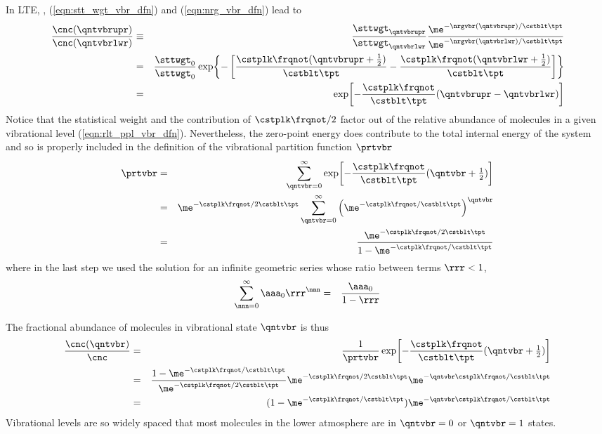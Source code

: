 \documentclass[12pt]{article}
\begin{document}
In LTE, , (\ref{eqn:stt_wgt_vbr_dfn}) and
(\ref{eqn:nrg_vbr_dfn}) lead to
\begin{eqnarray}
\frac{\cnc(\qntvbrupr)}{\cnc(\qntvbrlwr)} & \equiv & 
\frac{\sttwgt_{\qntvbrupr}}{\sttwgt_{\qntvbrlwr}}
\frac{\me^{-\nrgvbr(\qntvbrupr)/\cstblt\tpt}}{\me^{-\nrgvbr(\qntvbrlwr)/\cstblt\tpt}}
\nonumber \\ 
& = & 
\frac{\sttwgt_{0}}{\sttwgt_{0}}
\exp\! \left\{
- \left[ \frac{\cstplk \frqnot (\qntvbrupr + \frac{1}{2})}{\cstblt \tpt}
-\frac{\cstplk \frqnot (\qntvbrlwr + \frac{1}{2})}{\cstblt \tpt}
\right] \right\} \nonumber \\
& = & 
\exp\! \left[
-\frac{\cstplk \frqnot}{\cstblt \tpt}(\qntvbrupr - \qntvbrlwr)
\right]
\label{eqn:rlt_ppl_vbr_dfn}
\end{eqnarray}
Notice that the statistical weight and the  
contribution of $\cstplk \frqnot /2$ factor out of the relative
abundance of molecules in a given vibrational level
(\ref{eqn:rlt_ppl_vbr_dfn}).
Nevertheless, the zero-point energy does contribute to the total
internal energy of the system and so is properly included in the 
definition of the vibrational partition function $\prtvbr$
\begin{eqnarray}
\prtvbr & = & 
\sum_{\qntvbr = 0}^{\infty} 
\exp\! \left[
-\frac{\cstplk \frqnot}{\cstblt \tpt} ( \qntvbr + {\textstyle\frac{1}{2}} )
\right] \nonumber \\
& = & 
\me^{-\cstplk \frqnot/2\cstblt \tpt}
\sum_{\qntvbr = 0}^{\infty} 
\left( \me^{-\cstplk \frqnot / \cstblt \tpt} \right)^{\qntvbr}
\nonumber \\
& = & 
\frac{\me^{-\cstplk \frqnot/2\cstblt \tpt}}
{1-\me^{-\cstplk \frqnot / \cstblt \tpt}}
\label{eqn:prt_vbr_val}
\end{eqnarray}
where in the last step we used the solution for an infinite
geometric series whose ratio between terms $\rrr < 1$, 
\begin{eqnarray}
\sum_{\nnn=0}^{\infty} \aaa_{0} \rrr^{\nnn} & = &
\frac{\aaa_{0}}{1 - \rrr}
\label{eqn:gmt_srs_dfn}
\end{eqnarray}

The fractional abundance of molecules in vibrational state
$\qntvbr$ is thus
\begin{eqnarray}
\frac{\cnc(\qntvbr)}{\cnc} 
& = &
\frac{1}{\prtvbr}
\exp\! \left[
-\frac{\cstplk \frqnot}{\cstblt \tpt} (\qntvbr + {\textstyle\frac{1}{2}}) \right]
\nonumber \\
& = &
\frac{1-\me^{-\cstplk \frqnot / \cstblt \tpt}}
{\me^{-\cstplk \frqnot/2\cstblt \tpt}}
\me^{-\cstplk \frqnot/2\cstblt \tpt}
\me^{-\qntvbr \cstplk \frqnot /\cstblt \tpt} \nonumber \\
& = &
(1-\me^{-\cstplk \frqnot / \cstblt \tpt})
\me^{-\qntvbr \cstplk \frqnot /\cstblt \tpt}
\label{eqn:ppl_frc_vbr_dfn}
\end{eqnarray}
Vibrational levels are so widely spaced that most molecules in the
lower atmosphere are in $\qntvbr = 0$ or $\qntvbr = 1$ states.
\end{document}
